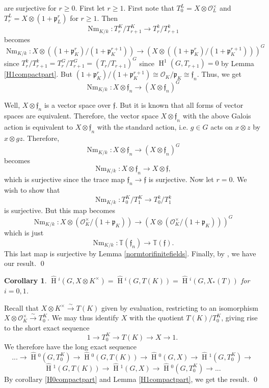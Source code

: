 \documentclass[11pt]{amsart}
\theoremstyle{plain}
\newtheorem{corollary}[theorem]{Corollary}
\newcommand{\HT}[1]{\hat{\HH}{}^{#1}}
\theoremstyle{definition}
\DeclareMathOperator{\HH}{H}
\DeclareMathOperator{\Nm}{Nm}
\begin{document}
are surjective for $r \geq 0$.  First let $r \geq 1$.  First note that
$T_0^L = X \otimes \mathcal{O}_L^\times$ and
$T_r^L = X \otimes (1 + \mathfrak{p}_L^r)$ for $r \geq 1$.  Then
$$\Nm_{K/k} : T_r^K / T_{r+1}^K \rightarrow T_r^k / T_{r+1}^k$$
becomes
$$\Nm_{K/k} : X \otimes \left( (1 + \mathfrak{p}_K^r) / (1 +
  \mathfrak{p}_K^{r+1}) \right) \rightarrow (X \otimes \left( (1 +
  \mathfrak{p}_K^r) / (1 + \mathfrak{p}_K^{r+1}) \right) )^G$$
since $T_r^k / T_{r+1}^k = T_r^G / T_{r+1}^G = (T_r / T_{r+1})^G$ since
$\HH^1(G, T_{r+1}) = 0$ by Lemma \ref{H1compactpart}.  But
$(1 + \mathfrak{p}_K^r) / (1 + \mathfrak{p}_K^{r+1}) \cong \mathcal{O}_K / \mathfrak{p}_K \cong \mathfrak{f}_n$.
Thus, we get
$$\Nm_{K/k} : X \otimes \mathfrak{f}_n \rightarrow (X \otimes \mathfrak{f}_n)^G$$

Well, $X \otimes \mathfrak{f}_n$ is a vector space over
$\mathfrak{f}$.  But it is known that all forms of vector spaces are
equivalent.  Therefore, the vector space $X \otimes \mathfrak{f}_n$
with the above Galois action is equivalent to $X \otimes \mathfrak{f}_n$
with the standard action, i.e. $g \in G$ acts on $x \otimes z$ by
$x \otimes gz$.  Therefore,
$$\Nm_{K/k} : X \otimes \mathfrak{f}_n \rightarrow (X \otimes \mathfrak{f}_n)^G$$
becomes
$$\Nm_{K/k} : X \otimes \mathfrak{f}_n \rightarrow X \otimes \mathfrak{f},$$
which is surjective since the trace map $\mathfrak{f}_n \rightarrow \mathfrak{f}$
is surjective.  Now let $r = 0$.  We wish to show that
$$\Nm_{K/k} : T_0^K / T_1^K \rightarrow T_0^k / T_1^k$$
is surjective.  But this map becomes
$$\Nm_{K/k} : X \otimes \left( \mathcal{O}_K^\times / (1 + \mathfrak{p}_K) \right) \rightarrow (X \otimes \left( \mathcal{O}_K^\times / (1 + \mathfrak{p}_K) \right) )^G$$
which is just
$$\Nm_{K/k} : \mathbb{T}(\mathfrak{f}_n) \rightarrow \mathbb{T}(\mathfrak{f}).$$
This last map is surjective by Lemma \ref{normtorifinitefields}.
Finally, by \cite[Lemma 2, p. 81]{serre1}, we have our result.
\qed

\begin{corollary}\label{reductiontori}
$\HT{i}(G, X \otimes K^\times) = \HT{i}(G, T(K)) = \HT{i}(G,X_*(T))$ for $i=0,1$.
\end{corollary}

\proof

Recall that $X \otimes K^\times \xrightarrow{\sim} T(K)$ given by
evaluation, restricting to an isomorphism $X \otimes \mathcal{O}_K^\times
\xrightarrow{\sim} T_0^K$.  We may thus identify $X$ with the quotient
$T(K) / T_0^K$, giving rise to the short exact sequence
$$1 \rightarrow T_0^K \rightarrow T(K) \rightarrow X \rightarrow 1.$$
We therefore have the long exact sequence
$$... \rightarrow \HT{0}(G, T_0^K) \rightarrow \HT{0}(G, T(K)) \rightarrow \HT{0}(G, X)
\rightarrow \HT{1}(G, T_0^K) \rightarrow $$ $$\HT{1}(G, T(K))
\rightarrow \HT{1}(G, X) \rightarrow \HT{0}(G, T_0^K)
\rightarrow ...$$
By corollary \ref{H0compactpart} and Lemma \ref{H1compactpart}, we get the result.
\qed
\end{document}
